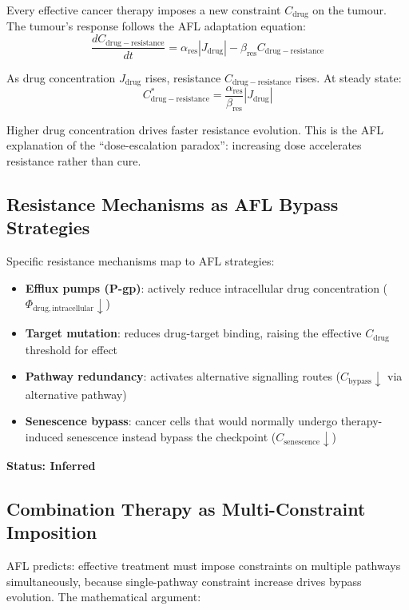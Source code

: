 \documentclass[12pt,a4paper]{article}
\begin{document}
Every effective cancer therapy imposes a new constraint $C_{\mathrm{drug}}$ on the tumour. The tumour's response follows the AFL adaptation equation:
\begin{equation}
    \frac{dC_{\mathrm{drug-resistance}}}{dt} = \alpha_{\mathrm{res}} |J_{\mathrm{drug}}| - \beta_{\mathrm{res}} C_{\mathrm{drug-resistance}}
\end{equation}

As drug concentration $J_{\mathrm{drug}}$ rises, resistance $C_{\mathrm{drug-resistance}}$ rises. At steady state:
\begin{equation}
    C_{\mathrm{drug-resistance}}^* = \frac{\alpha_{\mathrm{res}}}{\beta_{\mathrm{res}}} |J_{\mathrm{drug}}|
\end{equation}

Higher drug concentration drives faster resistance evolution. This is the AFL explanation of the ``dose-escalation paradox'': increasing dose accelerates resistance rather than cure.

\subsection{Resistance Mechanisms as AFL Bypass Strategies}

Specific resistance mechanisms map to AFL strategies:
\begin{itemize}
    \item \textbf{Efflux pumps (P-gp)}: actively reduce intracellular drug concentration ($\Phi_{\mathrm{drug,intracellular}} \downarrow$)
    \item \textbf{Target mutation}: reduces drug-target binding, raising the effective $C_{\mathrm{drug}}$ threshold for effect
    \item \textbf{Pathway redundancy}: activates alternative signalling routes ($C_{\mathrm{bypass}} \downarrow$ via alternative pathway)
    \item \textbf{Senescence bypass}: cancer cells that would normally undergo therapy-induced senescence instead bypass the checkpoint ($C_{\mathrm{senescence}} \downarrow$)
\end{itemize}

\textbf{Status: Inferred}

\subsection{Combination Therapy as Multi-Constraint Imposition}

AFL predicts: effective treatment must impose constraints on multiple pathways simultaneously, because single-pathway constraint increase drives bypass evolution. The mathematical argument:
\end{document}
